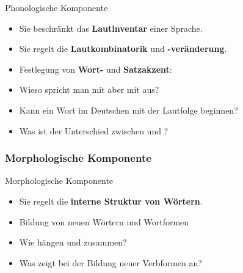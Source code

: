 \begin{frame}{Phonologische Komponente}

	\begin{itemize}
		\item Sie beschränkt das \textbf{Lautinventar} einer Sprache.
\medskip
		\item Sie regelt die \textbf{Lautkombinatorik} und \textbf{-veränderung}.
\medskip
		\item Festlegung von \textbf{Wort-} und \textbf{Satzakzent}:
\pause
\bigskip
		\item[\ra] Wieso spricht man  mit \textipa{[t]} aber  mit \textipa{[d]} aus?
\pause
		\item[\ra] Kann ein Wort im Deutschen mit der Lautfolge \textipa{[Ng]} beginnen?
\pause
		\item[\ra] Was ist der Unterschied zwischen  und ?
	\end{itemize}
	
\end{frame}


\subsubsection{Morphologische Komponente}

\begin{frame}{Morphologische Komponente}

\begin{itemize}
	\item Sie regelt die \textbf{interne Struktur von Wörtern}.
\medskip
	\item Bildung von neuen Wörtern und Wortformen
\pause
\bigskip
	\item[\ra] Wie hängen  und  zusammen?
\pause
	\item[\ra] Was zeigt  bei der Bildung neuer Verbformen an?
\end{itemize}

\end{frame}


